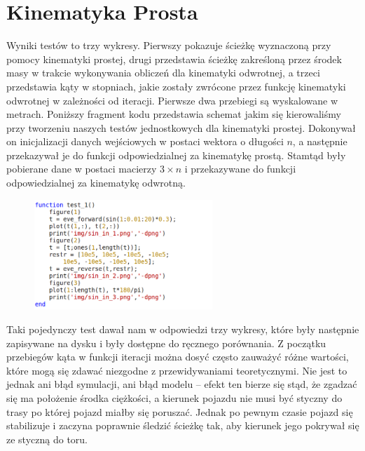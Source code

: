 \documentclass[a4paper, 12pt]{report}
\begin{document}
		\section{Kinematyka Prosta}
			Wyniki testów to trzy wykresy. Pierwszy pokazuje ścieżkę wyznaczoną przy pomocy kinematyki prostej, drugi przedstawia ścieżkę zakreśloną przez środek masy w trakcie wykonywania obliczeń dla kinematyki odwrotnej, a trzeci przedstawia kąty w stopniach, jakie zostały zwrócone przez funkcję kinematyki odwrotnej w zależności od iteracji. Pierwsze dwa przebiegi są wyskalowane w metrach.
			\newline
			\newline
			\noindent Poniższy fragment kodu przedstawia schemat jakim się kierowaliśmy przy tworzeniu naszych testów jednostkowych dla kinematyki prostej. Dokonywał on inicjalizacji danych wejściowych w postaci wektora o długości $n$, a następnie przekazywał je do funkcji odpowiedzialnej za kinematykę prostą. Stamtąd były pobierane dane w postaci macierzy $3\times n$ i przekazywane do funkcji odpowiedzialnej za kinematykę odwrotną.
			\begin{figure}[H]
				\centering
				\includegraphics[width = 0.6\textwidth]{./codes/test.png}
			\end{figure}
			\noindent Taki pojedynczy test dawał nam w odpowiedzi trzy wykresy, które były następnie zapisywane na dysku i były dostępne do ręcznego porównania.
			\newline
			\newline
			Z początku przebiegów kąta w funkcji iteracji można dosyć często zauważyć różne wartości, które mogą się zdawać niezgodne z przewidywaniami teoretycznymi. Nie jest to jednak ani błąd symulacji, ani błąd modelu -- efekt ten bierze się stąd, że zgadzać się ma położenie środka ciężkości, a kierunek pojazdu nie musi być styczny do trasy po której pojazd miałby się poruszać. Jednak po pewnym czasie pojazd się stabilizuje i zaczyna poprawnie śledzić ścieżkę tak, aby kierunek jego pokrywał się ze styczną do toru.
			\newpage
\end{document}
